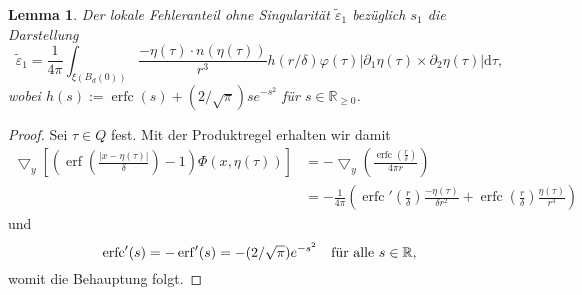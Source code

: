 \documentclass[12pt,a4paper]{scrartcl}
\newtheorem{Lemma}[Satz]{Lemma}
\newcommand{\dd}{\mathrm{d}}
\numberwithin{equation}{section}
\newcommand{\R}{\mathbb{R}} %
\newcommand{\grad}{\bigtriangledown}
\newcommand{\erf}{\operatorname{erf}}
\newcommand{\erfc}{\operatorname{erfc}}
\newcommand{\fa}{\text{\quad für alle }}
\begin{document}
\begin{Lemma}
Der lokale Fehleranteil ohne Singularität $\widetilde\varepsilon_1$ bezüglich $s_1$ die Darstellung 
\begin{equation} \label{eps1}
\widetilde\varepsilon_1= \frac{1}{4 \pi} \int_{\xi(B_d(0))}  \frac{- \eta(\tau)\cdot n(\eta(\tau)) }{r^3} h(r/\delta) \varphi(\tau) |\partial_1 \eta (\tau) \times \partial_2 \eta(\tau)| \dd \tau,
\end{equation}
wobei $h(s):= \erfc(s)+(2/\sqrt{\pi})s e ^{-s^2 }$ für $s \in \R_{\geq 0}$.
\end{Lemma}


\begin{proof}
Sei $\tau \in Q$ fest. Mit der Produktregel erhalten wir damit
\begin{align*}
\grad_y\left[ \left(\erf \left(\frac{|x-\eta(\tau)|}{\delta}\right) - 1\right) \Phi (x,\eta(\tau)) \right] &= - \grad_y\left(\frac{\erfc(\frac{r}{\delta})}{4 \pi r}\right) \\
&= - \frac{1}{4 \pi} \left(\erfc'(\frac{r}{\delta})\frac{-\eta(\tau)}{\delta r^2} + \erfc(\frac{r}{\delta})\frac{\eta(\tau)}{r^3} \right)
\end{align*} und 
\[
\erfc'(s)=-\erf'(s)=-(2/\sqrt{\pi})e^{-s^2} \fa s \in \R,
\] womit die Behauptung folgt.
\end{proof}
\end{document}
